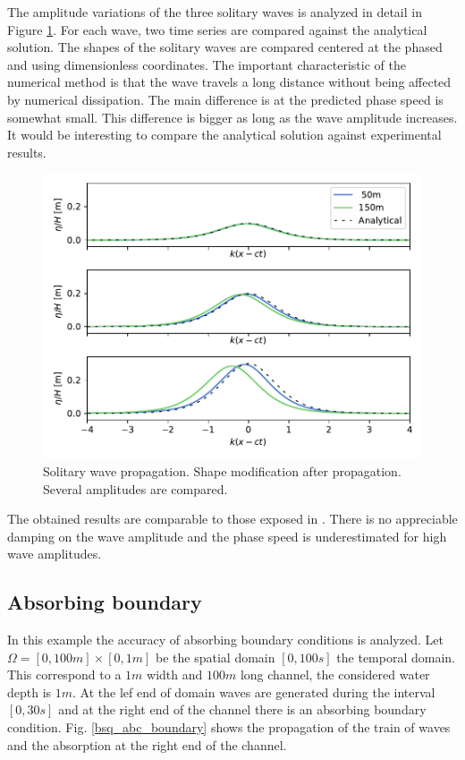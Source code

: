 The amplitude variations of the three solitary waves is analyzed in detail in Figure \ref{bsq_solitary_wave_shapes}. For each wave, two time series are compared against the analytical solution. The shapes of the solitary waves are compared centered at the phased and using dimensionless coordinates. The important characteristic of the numerical method is that the wave travels a long distance without being affected by numerical dissipation. The main difference is at the predicted phase speed is somewhat small. This difference is bigger as long as the wave amplitude increases. It would be interesting to compare the analytical solution against experimental results.

\begin{figure}[htb!]
    \centering
    \includegraphics[width=.8\textwidth]{img/boussinesq/shapes.pdf}
    \caption{Solitary wave propagation. Shape modification after propagation. Several amplitudes are compared.}
    \label{bsq_solitary_wave_shapes}
\end{figure}

The obtained results are comparable to those exposed in \cite{wei1995}. There is no appreciable damping on the wave amplitude and the phase speed is underestimated for high wave amplitudes.



\subsection{Absorbing boundary}


In this example the accuracy of absorbing boundary conditions is analyzed. Let $\Omega = [0,100m] \times [0,1m]$ be the spatial domain $[0,100s]$ the temporal domain. This correspond to a $1m$ width and $100m$ long channel, the considered water depth is $1m$. At the lef end of domain waves are generated during the interval $[0,30s]$ and at the right end of the channel there is an absorbing boundary condition. Fig. \ref{bsq_abc_boundary} shows the propagation of the train of waves and the absorption at the right end of the channel.


